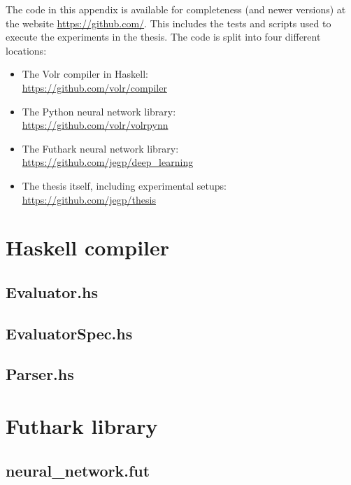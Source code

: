 
The code in this appendix is available for completeness (and newer versions) 
at the website \url{https://github.com/}. 
This includes the tests and scripts used to execute the experiments in the
thesis.
The code is split into four different locations:
\begin{itemize}
  \item The Volr compiler in Haskell: \\ \url{https://github.com/volr/compiler}
  \item The Python neural network library: \\ \url{https://github.com/volr/volrpynn}
  \item The Futhark neural network library: \\ \url{https://github.com/jegp/deep_learning}
  \item The thesis itself, including experimental setups: \\ \url{https://github.com/jegp/thesis}
\end{itemize}

\lstset{mathescape=false,showstringspaces=false,breaklines=true,basicstyle=\ttfamily\scriptsize}

\section{Haskell compiler}
\subsection{Evaluator.hs}


\subsection{EvaluatorSpec.hs}


\subsection{Parser.hs} \label{app:implementation_parser}


\section{Futhark library}
\subsection{neural\_network.fut} \label{app:implementation_fut_nn}


